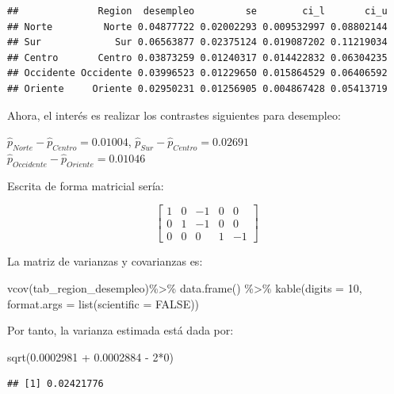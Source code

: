 \documentclass[
  12pt,
]{book}
\newenvironment{Shaded}{\begin{snugshade}}{\end{snugshade}}
\newcommand{\AttributeTok}[1]{\textcolor[rgb]{0.77,0.63,0.00}{#1}}
\newcommand{\ConstantTok}[1]{\textcolor[rgb]{0.00,0.00,0.00}{#1}}
\newcommand{\DecValTok}[1]{\textcolor[rgb]{0.00,0.00,0.81}{#1}}
\newcommand{\FloatTok}[1]{\textcolor[rgb]{0.00,0.00,0.81}{#1}}
\newcommand{\FunctionTok}[1]{\textcolor[rgb]{0.00,0.00,0.00}{#1}}
\newcommand{\NormalTok}[1]{#1}
\newcommand{\SpecialCharTok}[1]{\textcolor[rgb]{0.00,0.00,0.00}{#1}}
\begin{document}
\begin{verbatim}
##              Region  desempleo         se        ci_l       ci_u
## Norte         Norte 0.04877722 0.02002293 0.009532997 0.08802144
## Sur             Sur 0.06563877 0.02375124 0.019087202 0.11219034
## Centro       Centro 0.03873259 0.01240317 0.014422832 0.06304235
## Occidente Occidente 0.03996523 0.01229650 0.015864529 0.06406592
## Oriente     Oriente 0.02950231 0.01256905 0.004867428 0.05413719
\end{verbatim}

Ahora, el interés es realizar los contrastes siguientes para desempleo:

\(\hat{p}_{Norte} - \hat{p}_{Centro} = 0.01004\),
\(\hat{p}_{Sur} - \hat{p}_{Centro} = 0.02691\)\\
\(\hat{p}_{Occidente} - \hat{p}_{Oriente} = 0.01046\)

Escrita de forma matricial sería:

\[
\left[\begin{array}{ccccc}
1 & 0 & -1 & 0 & 0\\
0 & 1 & -1 & 0 & 0\\
0 & 0 & 0 & 1 & -1
\end{array}\right]
\]

La matriz de varianzas y covarianzas es:

\begin{Shaded}
\begin{Highlighting}[]
\FunctionTok{vcov}\NormalTok{(tab\_region\_desempleo)}\SpecialCharTok{\%\textgreater{}\%}
  \FunctionTok{data.frame}\NormalTok{() }\SpecialCharTok{\%\textgreater{}\%} 
  \FunctionTok{kable}\NormalTok{(}\AttributeTok{digits =} \DecValTok{10}\NormalTok{,}
        \AttributeTok{format.args =} \FunctionTok{list}\NormalTok{(}\AttributeTok{scientific =} \ConstantTok{FALSE}\NormalTok{))}
\end{Highlighting}
\end{Shaded}

Por tanto, la varianza estimada está dada por:

\begin{Shaded}
\begin{Highlighting}[]
\FunctionTok{sqrt}\NormalTok{(}\FloatTok{0.0002981} \SpecialCharTok{+} \FloatTok{0.0002884} \SpecialCharTok{{-}} \DecValTok{2}\SpecialCharTok{*}\DecValTok{0}\NormalTok{)}
\end{Highlighting}
\end{Shaded}

\begin{verbatim}
## [1] 0.02421776
\end{verbatim}
\end{document}
